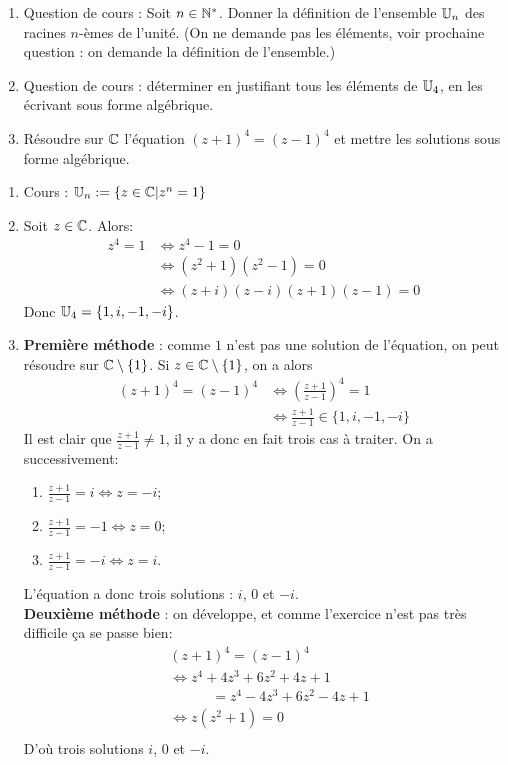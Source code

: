 \begin{exo}
\begin{enumerate}
\item Question de cours : Soit $n\in\mathbb{N}^*$. Donner la définition de l'ensemble $\mathbb{U}_n$ des racines $n$-èmes de l'unité. (On ne demande pas les éléments, voir prochaine question : on demande la définition de l'ensemble.)
\item Question de cours : déterminer en justifiant tous les éléments de $\mathbb{U}_4$, en les écrivant sous forme algébrique.
\item Résoudre sur $\mathbb{C}$ l'équation $(z+1)^4=(z-1)^4$ et mettre les solutions sous forme algébrique.
\end{enumerate}
\begin{sol}
\begin{enumerate}
\item Cours : $\mathbb{U}_n:=\left\{z\in\mathbb{C}\middle|z^n=1 \right\}$
\item 
Soit $z\in\mathbb{C}$. Alors:
\begin{align*}
z^4=1
&\iff z^4-1=0\\
&\iff (z^2+1)(z^2-1)=0 \\
&\iff (z+i)(z-i)(z+1)(z-1)=0
\end{align*}
Donc $\mathbb{U}_4=\{1,i,-1,-i\}$.
\item \textbf{Première méthode} : comme $1$ n'est pas une solution de l'équation, on peut résoudre sur $\mathbb{C}\setminus \{1\}$. Si $z\in \mathbb{C}\setminus \{1\}$, on a alors
\begin{align*}
(z+1)^4=(z-1)^4
&\iff \left(\frac{z+1}{z-1}\right)^4=1\\
&\iff \frac{z+1}{z-1} \in\{1,i,-1,-i\}
\end{align*}
Il est clair que $\frac{z+1}{z-1}\neq 1$, il y a donc en fait trois cas à traiter. On a successivement:
\begin{enumerate}
\item $\frac{z+1}{z-1}=i\iff z=-i$;
\item $\frac{z+1}{z-1}=-1\iff z=0$;
\item $\frac{z+1}{z-1}=-i\iff z=i$.
\end{enumerate}
L'équation a donc trois solutions : $i$, $0$ et $-i$.\\
\textbf{Deuxième méthode} : on développe, et comme l'exercice n'est pas très difficile ça se passe bien: 
\begin{align*}
&(z+1)^4=(z-1)^4\\
&\iff z^4+4z^3+6z^2+4z+1\\
&\quad\quad\quad=z^4-4z^3+6z^2-4z+1\\
&\iff z(z^2+1)=0\\
\end{align*}
D'où trois solutions $i$, $0$ et $-i$. 
\end{enumerate}
\end{sol}
\end{exo}


